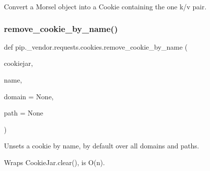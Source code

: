 \begin{DoxyVerb}Convert a Morsel object into a Cookie containing the one k/v pair.\end{DoxyVerb}
 \mbox{\label{namespacepip_1_1__vendor_1_1requests_1_1cookies_a05b3875ddaca8156cc9d6396a286c345}} 
\subsubsection{\texorpdfstring{remove\+\_\+cookie\+\_\+by\+\_\+name()}{remove\_cookie\_by\_name()}}
{\footnotesize\ttfamily def pip.\+\_\+vendor.\+requests.\+cookies.\+remove\+\_\+cookie\+\_\+by\+\_\+name (\begin{DoxyParamCaption}\item[{}]{cookiejar,  }\item[{}]{name,  }\item[{}]{domain = {\ttfamily None},  }\item[{}]{path = {\ttfamily None} }\end{DoxyParamCaption})}

\begin{DoxyVerb}Unsets a cookie by name, by default over all domains and paths.

Wraps CookieJar.clear(), is O(n).
\end{DoxyVerb}
 